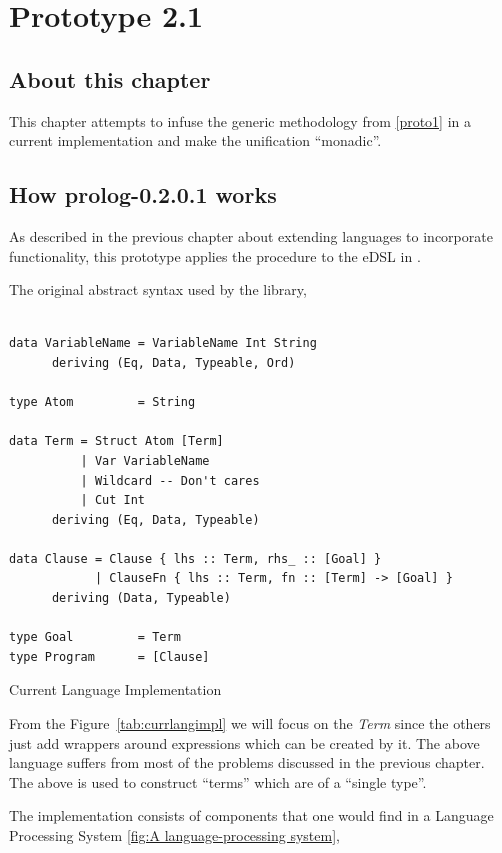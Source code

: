 \documentclass[thesis-solanki.tex]{subfiles}
\begin{document}
\chapter{Prototype 2.1}{\label{proto2.1}}

\section{About this chapter}
This chapter attempts to infuse the generic methodology from \ref{proto1} in a current  implementation \cite{prolog-lib}
and make the unification ``monadic''.

\section{How prolog-0.2.0.1 works}

As described in the previous chapter about extending languages to incorporate functionality, this prototype applies the procedure to the
eDSL in \cite{prolog-lib}.

The original abstract syntax used by the library,
\begin{code-list}[h]
\begin{verbatim}

data VariableName = VariableName Int String
      deriving (Eq, Data, Typeable, Ord)

type Atom         = String

data Term = Struct Atom [Term]
          | Var VariableName
          | Wildcard -- Don't cares
          | Cut Int
      deriving (Eq, Data, Typeable)

data Clause = Clause { lhs :: Term, rhs_ :: [Goal] }
            | ClauseFn { lhs :: Term, fn :: [Term] -> [Goal] }
      deriving (Data, Typeable)

type Goal         = Term
type Program      = [Clause]
\end{verbatim}
\caption{Current Language Implementation}
\label{tab:currlangimpl}
\end{code-list}

From the Figure~\ref{tab:currlangimpl} we will focus on the \textit{Term} since the others just add wrappers around expressions which can
be created by it. The above language suffers from most of the problems discussed in the previous chapter. The above is used to construct
 ``terms'' which are of a ``single type''.


The implementation consists of components that one would find in a Language Processing System \ref{fig:A language-processing system},
\end{document}
